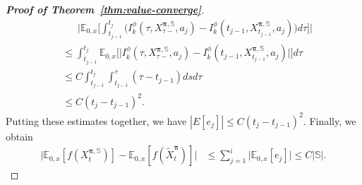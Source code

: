 \documentclass[11pt]{article}
\newcommand{\1}{\mathbbm{1}}
\newcommand{\bpi}{\boldsymbol{\pi}}
\begin{document}
\begin{proof}[\bf Proof of Theorem~\ref{thm:value-converge}]
\begin{align}
	&\phantom{\leq~}\Big|\mathbb{E}_{0,x}\Big[\int_{t_{j-1}}^{t_j}\big(I_k^\phi(\tau, X_{\tau-}^{\bpi, \mathbb{S}}, a_j)-I_k^\phi(t_{j-1}, X_{t_{j-1}}^{\bpi, \mathbb{S}}, a_j)\big)d\tau\Big]\Big|\\
	&\leq\int_{t_{j-1}}^{t_j}\mathbb{E}_{0,x}\Big[\big|I_k^\phi(\tau, X_{\tau-}^{\bpi, \mathbb{S}}, a_j)-I_k^\phi(t_{j-1}, X_{t_{j-1}}^{\bpi, \mathbb{S}}, a_j)\big|\Big]d\tau\\
	&\leq C\int_{t_{j-1}}^{t_j}\int_{t_{j-1}}^{\tau}(\tau-t_{j-1})dsd\tau\\
	&\leq C(t_j-t_{j-1})^2.
\end{align}
Putting these estimates together, we have $|E[e_j]|\leq C(t_j-t_{j-1})^2$. Finally, we obtain
\begin{align}
	\big|\mathbb{E}_{0,x}[f( X_t^{\bpi,\mathbb{S}})] - \mathbb{E}_{0,x}[f(\tilde X_t^{\bpi})]\big|
	&\leq \sum_{j=1}^{i} \big|\mathbb{E}_{0,x}[e_j]\big|\leq C|\mathbb{S}|.
\end{align}


\end{proof}
\end{document}
